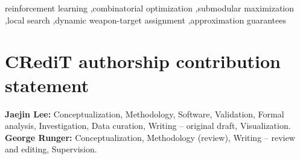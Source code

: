 \documentclass[preprint,12pt]{elsarticle}
\begin{document}
\begin{frontmatter}
\begin{abstract}
Applied to DWTA the criterion leaves one bit per weapon per stage. A graph
neural network emits that bit for every weapon in a single pass; the greedy
rule assigns targets; a fixed local search then revises the schedule and
cannot degrade it. Trained only on instances of 5 to 7 weapons, targets and
stages, the framework generalizes zero-shot to 70 weapons, 100 targets and 15
stages. It outperforms every baseline that learns both decisions, lowering the
mean objective 13.1\% below the strongest of them while running 2.2 times
faster, and the same pipeline with the learned bit removed is four times
worse, which locates the value precisely where the criterion predicts.
\end{abstract}

\begin{keyword}
reinforcement learning \sep combinatorial optimization \sep submodular maximization
\sep local search \sep dynamic weapon-target assignment \sep approximation guarantees
\end{keyword}

\end{frontmatter}










\section*{CRediT authorship contribution statement}

\textbf{Jaejin Lee:} Conceptualization, Methodology, Software, Validation,
Formal analysis, Investigation, Data curation, Writing -- original draft,
Visualization. \textbf{George Runger:} Conceptualization, Methodology
(review), Writing -- review and editing, Supervision.
\end{document}
